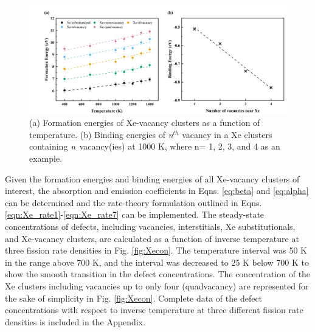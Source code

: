 \documentclass[preprint,12pt]{elsarticle}
\begin{document}
\begin{figure}[hbt!]
\centering
\includegraphics[width=1\textwidth]{Fig7.png}
\caption{(a) Formation energies of Xe-vacancy clusters as a function of temperature. (b) Binding energies of \textit{n}$^{th}$ vacancy in a Xe clusters containing $\it{n}$ vacancy(ies) at 1000 K, where n= 1, 2, 3, and 4 as an example.}
\label{fig:FEBE77}
\end{figure}

Given the formation energies and binding energies of all Xe-vacancy clusters of interest, the absorption and emission coefficients in Eqns. \ref{eq:beta} and \ref{eq:alpha} can be determined and the rate-theory formulation outlined in Eqns. \ref{eqn:Xe_rate1}-\ref{eqn:Xe_rate7} can be implemented. The steady-state concentrations of defects, including vacancies, interstitials, Xe substitutionals, and Xe-vacancy clusters, are calculated as a function of inverse temperature at three fission rate densities in Fig. \ref{fig:Xecon}. The temperature interval was 50 K in the range above 700 K, and the interval was decreased to 25 K below 700 K to show the smooth transition in the defect concentrations. The concentration of the Xe clusters including vacancies up to only four (quadvacancy) are represented for the sake of simplicity in Fig. \ref{fig:Xecon}. Complete data of the defect concentrations with respect to inverse temperature at three different fission rate densities is included in the Appendix. 
\end{document}
